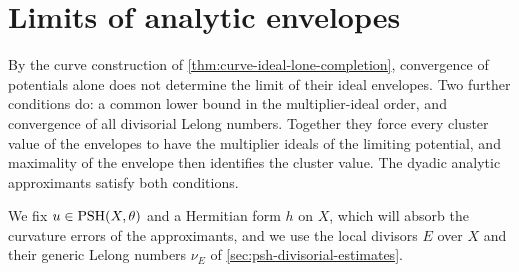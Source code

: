 \section{Limits of analytic envelopes}
\label{sec:analytic-envelope-limits}

By the curve construction of \cref{thm:curve-ideal-lone-completion}, convergence of potentials alone does not determine the limit of their ideal envelopes. Two further conditions do: a common lower bound in the multiplier-ideal order, and convergence of all divisorial Lelong numbers. Together they force every cluster value of the envelopes to have the multiplier ideals of the limiting potential, and maximality of the envelope then identifies the cluster value. The dyadic analytic approximants satisfy both conditions.

We fix $u\in\mathrm{PSH}(X,\theta)$ and a Hermitian form $h$ on $X$, which will absorb the curvature errors of the approximants, and we use the local divisors $E$ over $X$ and their generic Lelong numbers $\nu_E$ of \cref{sec:psh-divisorial-estimates}.

